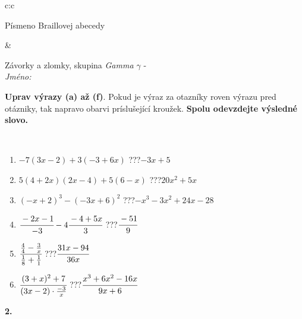 \documentclass[10pt]{report}
\begin{document}
\begin{tabular}{c:c}
\begin{minipage}[c][104.5mm][t]{0.5\linewidth}
\begin{center}
\begin{minipage}{0.20\linewidth}
\begin{center}
{\small Písmeno Braillovej abecedy}
\end{center}
\end{minipage}
\end{center}
\end{minipage}
&
\begin{minipage}[c][104.5mm][t]{0.5\linewidth}
\begin{center}
\vspace{7mm}
{\huge Závorky a zlomky, skupina \textit{Gamma $\gamma$} -}\\[5mm]
\textit{Jméno:}\phantom{xxxxxxxxxxxxxxxxxxxxxxxxxxxxxxxxxxxxxxxxxxxxxxxxxxxxxxxxxxxxxxxxx}\\[5mm]
\begin{minipage}{0.95\linewidth}
\begin{center}
\textbf{Uprav výrazy (a) až (f)}. Pokud je výraz za otazníky roven výrazu pred otázniky, tak napravo obarvi príslušející kroužek. \textbf{Spolu odevzdejte výsledné slovo.}
\end{center}
\end{minipage}
\\[1mm]
\begin{minipage}{0.79\linewidth}
\begin{center}
\begin{varwidth}{\linewidth}
\begin{enumerate}
\normalsize
\item $-7(3x-2)+3(-3+6x)$\quad \dotfill\; ???\;\dotfill \quad $-3x+5$
\item $5(4+2x)(2x-4)+5(6-x)$\quad \dotfill\; ???\;\dotfill \quad $20x^2+5x$
\item $(-x+2)^3-(-3x+6)^2$\quad \dotfill\; ???\;\dotfill \quad $-x^3-3x^2+24x-28$
\item $\cfrac{-2x-1}{-3}-4\cfrac{-4+5x}{3}$\quad \dotfill\; ???\;\dotfill \quad $\cfrac{-51}{9}$
\item $\cfrac{\frac{4}{4}-\frac{3}{x}}{\frac{1}{8}+\frac{1}{1}}$\quad \dotfill\; ???\;\dotfill \quad $\cfrac{31x-94}{36x}$
\item $\cfrac{(3+x)^2+7}{(3x-2)\cdot\frac{-3}{x}}$\quad \dotfill\; ???\;\dotfill \quad $\cfrac{x^3+6x^2-16x}{9x+6}$
\end{enumerate}
\end{varwidth}
\end{center}
\end{minipage}
\begin{minipage}{0.20\linewidth}
\begin{center}
{\Huge\bfseries 2.} \\[2mm]

\end{center}
\end{minipage}
\end{center}
\end{minipage}
\end{tabular}
\end{document}
